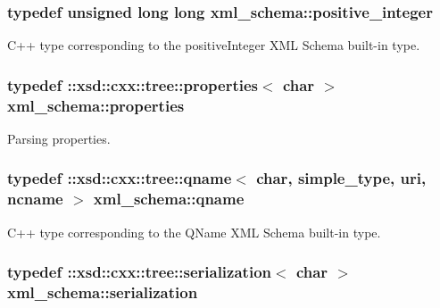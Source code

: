 \subsubsection[{positive\+\_\+integer}]{\setlength{\rightskip}{0pt plus 5cm}typedef unsigned long long {\bf xml\+\_\+schema\+::positive\+\_\+integer}}\label{namespacexml__schema_abe9d639a15a121d2868ae2f9c974ca24}


C++ type corresponding to the positive\+Integer X\+M\+L Schema built-\/in type. 

\hypertarget{namespacexml__schema_aba199bc39c8b21c427369c27d2bcfc8c}{}
\subsubsection[{properties}]{\setlength{\rightskip}{0pt plus 5cm}typedef \+::xsd\+::cxx\+::tree\+::properties$<$ char $>$ {\bf xml\+\_\+schema\+::properties}}\label{namespacexml__schema_aba199bc39c8b21c427369c27d2bcfc8c}


Parsing properties. 

\hypertarget{namespacexml__schema_af47d5d85d1b1714be503513b1c09c079}{}
\subsubsection[{qname}]{\setlength{\rightskip}{0pt plus 5cm}typedef \+::xsd\+::cxx\+::tree\+::qname$<$ char, {\bf simple\+\_\+type}, {\bf uri}, {\bf ncname} $>$ {\bf xml\+\_\+schema\+::qname}}\label{namespacexml__schema_af47d5d85d1b1714be503513b1c09c079}


C++ type corresponding to the Q\+Name X\+M\+L Schema built-\/in type. 

\hypertarget{namespacexml__schema_a40e04a11c9e6204762591b4de3755899}{}
\subsubsection[{serialization}]{\setlength{\rightskip}{0pt plus 5cm}typedef \+::xsd\+::cxx\+::tree\+::serialization$<$ char $>$ {\bf xml\+\_\+schema\+::serialization}}\label{namespacexml__schema_a40e04a11c9e6204762591b4de3755899}


